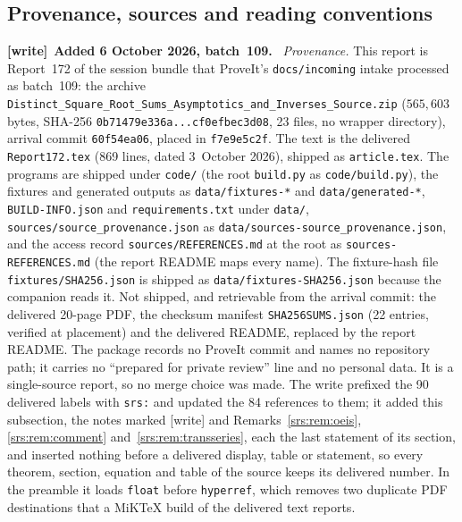 \documentclass[11pt]{article}
\numberwithin{equation}{section}
\theoremstyle{remark}\newtheorem{remark}[theorem]{Remark}
\newcommand{\file}[1]{\nolinkurl{#1}}
\newenvironment{writenote}[1][]{\par\smallskip\begingroup\small
 \noindent\textbf{[write]}\if\relax\detokenize{#1}\relax\else~\textbf{#1.}\fi\ }%
 {\par\endgroup\smallskip}
\begin{document}
\subsection{Provenance, sources and reading conventions}\label{srs:sec:provenance}
\begin{writenote}[Added 6 October 2026, batch~109]
\emph{Provenance.} This report is Report~172 of the session bundle that
ProveIt's \file{docs/incoming} intake processed as batch~109: the archive
\file{Distinct_Square_Root_Sums_Asymptotics_and_Inverses_Source.zip}
($565{,}603$ bytes, SHA-256 \file{0b71479e336a...cf0efbec3d08}, 23 files, no
wrapper directory), arrival commit \file{60f54ea06}, placed in
\file{f7e9e5c2f}. The text is the delivered \file{Report172.tex} (869 lines,
dated 3~October 2026), shipped as \file{article.tex}. The programs are
shipped under \file{code/} (the root \file{build.py} as
\file{code/build.py}), the fixtures and generated outputs as
\file{data/fixtures-*} and \file{data/generated-*},
\file{BUILD-INFO.json} and \file{requirements.txt} under \file{data/},
\file{sources/source_provenance.json} as
\file{data/sources-source_provenance.json}, and the access record
\file{sources/REFERENCES.md} at the root as \file{sources-REFERENCES.md}
(the report README maps every name). The fixture-hash file
\file{fixtures/SHA256.json} is shipped as \file{data/fixtures-SHA256.json}
because the companion reads it. Not shipped, and retrievable from the arrival
commit: the delivered 20-page PDF, the checksum manifest
\file{SHA256SUMS.json} (22 entries, verified at placement) and the delivered
README, replaced by the report README. The package records no ProveIt commit
and names no repository path; it carries no ``prepared for private review''
line and no personal data. It is a single-source report, so no merge choice
was made. The write prefixed the 90 delivered labels with \file{srs:} and
updated the 84 references to them; it added this subsection, the notes
marked [write] and Remarks~\ref{srs:rem:oeis}, \ref{srs:rem:comment}
and~\ref{srs:rem:transseries}, each the last statement of its section, and
inserted nothing before a delivered display, table or statement, so every
theorem, section, equation and table of the source keeps its delivered
number. In the preamble it loads \file{float} before \file{hyperref}, which
removes two duplicate PDF destinations that a MiKTeX build of the delivered
text reports.


\end{writenote}
\end{document}
